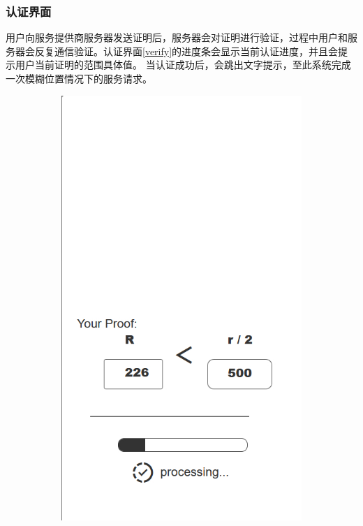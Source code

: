 \documentclass[zihao=-4]{ctexart}
\begin{document}
\subsubsection{认证界面}
\par
用户向服务提供商服务器发送证明后，服务器会对证明进行验证，过程中用户和服务器会反复通信验证。认证界面\ref{verify}的进度条会显示当前认证进度，并且会提示用户当前证明的范围具体值。
当认证成功后，会跳出文字提示，至此系统完成一次模糊位置情况下的服务请求。
\begin{figure}[htbp]
  \centering
  \begin{subfigure}{0.31\textwidth}
    \includegraphics[width=\linewidth]{前端-认证中.jpg}

\end{subfigure}
\end{figure}
\end{document}
